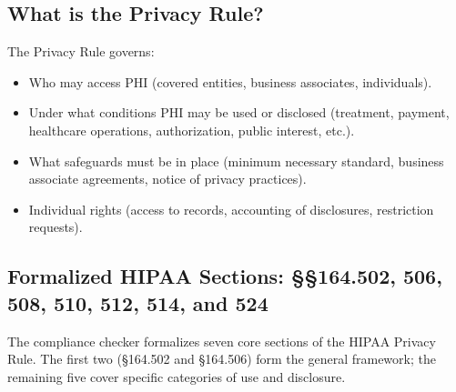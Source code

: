 \documentclass[11pt,letterpaper]{article}
\begin{document}
\subsection{What is the Privacy Rule?}

The Privacy Rule governs:
\begin{itemize}
  \item Who may access PHI (covered entities, business associates, individuals).
  \item Under what conditions PHI may be used or disclosed (treatment, payment, healthcare operations, authorization, public interest, etc.).
  \item What safeguards must be in place (minimum necessary standard, business associate agreements, notice of privacy practices).
  \item Individual rights (access to records, accounting of disclosures, restriction requests).
\end{itemize}

\subsection{Formalized HIPAA Sections: \S\S 164.502, 506, 508, 510, 512, 514, and 524}

The compliance checker formalizes seven core sections of the HIPAA Privacy Rule.
The first two (\S 164.502 and \S 164.506) form the general framework; the remaining five
cover specific categories of use and disclosure.
\end{document}
